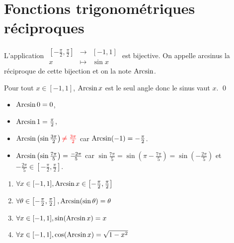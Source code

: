 \part{Fonctions trigonométriques réciproques}

\begin{prop-defn}
	L'application $\begin{array}{rcl}
		\left[ -\frac{\pi}{2}, \frac{\pi}{2} \right] &\longrightarrow& [-1, 1] \\
		x &\longmapsto& \sin x
	\end{array}$ est bijective. On appelle arcsinus la réciproque de cette bijection et on la note $\operatorname{Arcsin}$.

	Pour tout $x \in [-1, 1]$, $\operatorname{Arcsin} x$ est le seul angle  donc le sinus vaut $x$.
	\qed
\end{prop-defn}

\begin{exm}
	\begin{itemize}
		\item $\operatorname{Arcsin} 0 = 0$,
		\item $\operatorname{Arcsin} 1 = \frac{\pi}{2}$,
		\item $\operatorname{Arcsin}\left( \sin \frac{3\pi}{2} \right) \color{red}{\neq \frac{3\pi}{2}}$ car $\operatorname{Arcsin}(-1) = -\frac{\pi}{2}$.
		\item $\operatorname{Arcsin}\left( \sin \frac{7\pi}{5} \right) = \frac{-2\pi}{5}$ car $\sin \frac{7\pi}{5} = \sin \left( \pi - \frac{7\pi}{5} \right) = \sin\left( -\frac{2\pi}{5} \right)$ et $-\frac{2\pi}{5} \in \left[ -\frac{\pi}{2}, \frac{\pi}{2} \right]$.
	\end{itemize}
\end{exm}

\begin{prop}
	\begin{enumerate}
		\item $\forall x \in [-1, 1], \operatorname{Arcsin} x \in \left[ -\frac{\pi}{2}, \frac{\pi}{2} \right] $ 
		\item $\forall \theta \in \left[ -\frac{\pi}{2}, \frac{\pi}{2} \right], \operatorname{Arcsin}(\sin \theta) = \theta$ 
		\item $\forall x \in [-1, 1], \sin(\operatorname{Arcsin} x) = x$
		\item $\forall x \in [-1, 1], \cos(\operatorname{Arcsin} x) = \sqrt{1-x^2}$
	\end{enumerate}
\end{prop}

